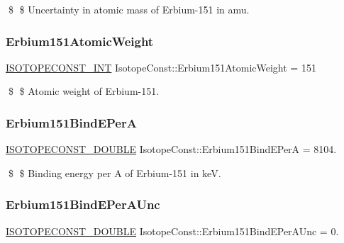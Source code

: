 \$ \$ Uncertainty in atomic mass of Erbium-\/151 in amu. \mbox{\label{group___isotope_const-_erbium-_er151_ga653920cb7f79cdd1aef7ffa2ba339f72}} 
\subsubsection{\texorpdfstring{Erbium151\+Atomic\+Weight}{Erbium151AtomicWeight}}
{\footnotesize\ttfamily \mbox{\hyperlink{group___isotope_const-_macros_ga5f18360b3e99483a35c32d789e62621c}{I\+S\+O\+T\+O\+P\+E\+C\+O\+N\+S\+T\+\_\+\+I\+NT}} Isotope\+Const\+::\+Erbium151\+Atomic\+Weight = 151}

\$ \$ Atomic weight of Erbium-\/151. \mbox{\label{group___isotope_const-_erbium-_er151_ga65886f31b1e0c0997cd6f1b3a27a49b0}} 
\subsubsection{\texorpdfstring{Erbium151\+Bind\+E\+PerA}{Erbium151BindEPerA}}
{\footnotesize\ttfamily \mbox{\hyperlink{group___isotope_const-_macros_ga8f45a7272ce02c0b4c65c44636ed719a}{I\+S\+O\+T\+O\+P\+E\+C\+O\+N\+S\+T\+\_\+\+D\+O\+U\+B\+LE}} Isotope\+Const\+::\+Erbium151\+Bind\+E\+PerA = 8104.}

\$ \$ Binding energy per A of Erbium-\/151 in keV. \mbox{\label{group___isotope_const-_erbium-_er151_ga94cd4ccbfc78fa616c1c6541d99d317a}} 
\subsubsection{\texorpdfstring{Erbium151\+Bind\+E\+Per\+A\+Unc}{Erbium151BindEPerAUnc}}
{\footnotesize\ttfamily \mbox{\hyperlink{group___isotope_const-_macros_ga8f45a7272ce02c0b4c65c44636ed719a}{I\+S\+O\+T\+O\+P\+E\+C\+O\+N\+S\+T\+\_\+\+D\+O\+U\+B\+LE}} Isotope\+Const\+::\+Erbium151\+Bind\+E\+Per\+A\+Unc = 0.}

